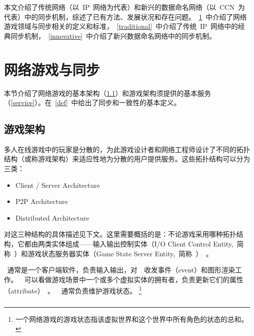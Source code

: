 本文介绍了传统网络（以~IP~网络为代表）和新兴的数据命名网络（以~CCN~为代表）中的同步机制，综述了已有方法、发展状况和存在问题。~\ref{notion}~中介绍了网络游戏领域与同步相关的定义和标准，~\ref{traditional}~中介绍了传统~IP~网络中的经典同步机制，~\ref{innovative}~中介绍了新兴数据命名网络中的同步机制。



\section{网络游戏与同步}
\label{notion}
本节介绍了网络游戏的基本架构（\ref{archi}）和游戏架构须提供的基本服务（\ref{service}）。在~\ref{def}~中给出了同步和一致性的基本定义。


\subsection{游戏架构}
\label{archi}

多人在线游戏中的玩家是分散的，为此游戏设计者和网络工程师设计了不同的拓扑结构（或称游戏架构）来适应性地为分散的用户提供服务。这些拓扑结构可以分为三类：
\begin{itemize}
\item Client {\slash} Server Architecture~\csa
\item P2P Architecture~\pa
\item Distributed Architecture~\da
\end{itemize}

对这三种结构的具体描述见下文。这里需要概括的是：不论游戏采用哪种拓扑结构，它都由两类实体组成——输入输出控制实体（I{\slash}O Client Control Entity,~简称~\ioc）和游戏状态服务器实体（Game State Server Entity,~简称~\gss）~\cite{Ferretti2005}。

\ioc~通常是一个客户端软件，负责输入输出，对~\gss~收发事件（event）和图形渲染工作。~\ioc~可以看做游戏场景中一个或多个虚拟实体的拥有者，负责更新它们的属性（attribute）~\cite{hla}。~\gss~通常负责维护游戏状态。
\renewcommand\baselinestretch{1} %
\footnote{一个网络游戏的游戏状态指该虚拟世界和这个世界中所有角色的状态的总和。}


\subsubsection{\csa} 

